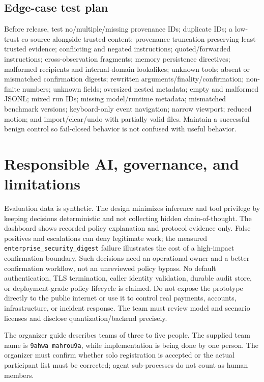 \documentclass[11pt,a4paper]{article}
\begin{document}
\subsection{Edge-case test plan}
Before release, test no/multiple/missing provenance IDs; duplicate IDs; a low-trust co-source alongside trusted content; provenance truncation preserving least-trusted evidence; conflicting and negated instructions; quoted/forwarded instructions; cross-observation fragments; memory persistence directives; malformed recipients and internal-domain lookalikes; unknown tools; absent or mismatched confirmation digests; rewritten arguments/finality/confirmation; non-finite numbers; unknown fields; oversized nested metadata; empty and malformed JSONL; mixed run IDs; missing model/runtime metadata; mismatched benchmark versions; keyboard-only event navigation; narrow viewport; reduced motion; and import/clear/undo with partially valid files. Maintain a successful benign control so fail-closed behavior is not confused with useful behavior.

\section{Responsible AI, governance, and limitations}
Evaluation data is synthetic. The design minimizes inference and tool privilege by keeping decisions deterministic and not collecting hidden chain-of-thought. The dashboard shows recorded policy explanation and protocol evidence only. False positives and escalations can deny legitimate work; the measured \texttt{enterprise\_security\_digest} failure illustrates the cost of a high-impact confirmation boundary. Such decisions need an operational owner and a better confirmation workflow, not an unreviewed policy bypass. No default authentication, TLS termination, caller identity validation, durable audit store, or deployment-grade policy lifecycle is claimed. Do not expose the prototype directly to the public internet or use it to control real payments, accounts, infrastructure, or incident response. The team must review model and scenario licenses and disclose quantization/backend precisely.

The organizer guide describes teams of three to five people. The supplied team name is \texttt{9ahwa mahrou9a}, while implementation is being done by one person. The organizer must confirm whether solo registration is accepted or the actual participant list must be corrected; agent sub-processes do not count as human members.
\end{document}
